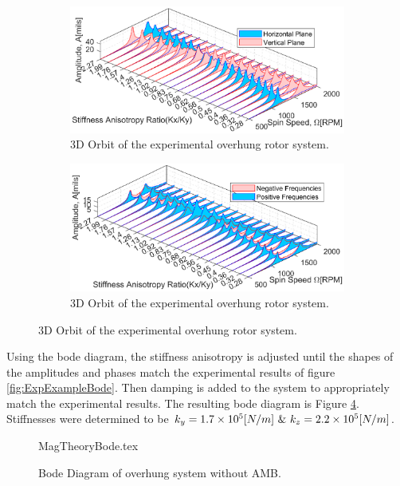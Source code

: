 \begin{figure}
\begin{subfigure}{\textwidth/2}
	\centering
	\includegraphics[width=\linewidth]{./figures/MagExampleHorVertStiffAniCompare.eps}
	\caption{3D Orbit of the experimental overhung rotor system.}
	\label{fig:HorVertStiffAniCompare}
\end{subfigure}
\begin{subfigure}{\textwidth/2}
	\centering
	\includegraphics[width=\linewidth]{./figures/MagExamplePosNegStiffAniCompare.eps}
	\caption{3D Orbit of the experimental overhung rotor system.}
	\label{fig:PosNegStiffAniCompare}
\end{subfigure}
\end{figure}
Using the bode diagram, the stiffness anisotropy is adjusted until the shapes of the amplitudes and phases match the experimental results of figure \ref{fig:ExpExampleBode}. Then damping is added to the system to appropriately match the experimental results. The resulting bode diagram is Figure \ref{fig:MagTheoryBode}. Stiffnesses were determined to be $ k_y=1.7\e{5}[N/m]\ \&\ k_z=2.2\e{5}[N/m] $.
\begin{figure}[!htb]
	\def\width{.6\linewidth}
	\def\height{.4\linewidth}
	\def\sep{3em}
	\centering
	{MagTheoryBode.tex}
	\caption{Bode Diagram of overhung system without AMB.}
	\label{fig:MagTheoryBode}
\end{figure}
